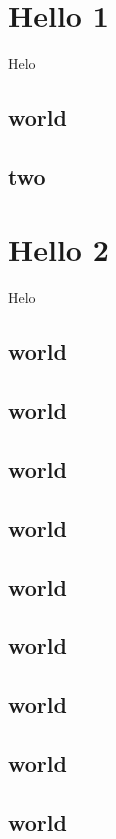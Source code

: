 \documentclass[10pt]{book}
\begin{document}
\tableofcontents
\chapter{Hello 1}
Helo
\section{world }
\section{two}

\chapter{Hello 2}
Helo
\section{world }
\section{world }

\section{world }

\section{world }

\section{world }

\section{world }

\section{world }

\section{world }

\section{world }
\end{document}
